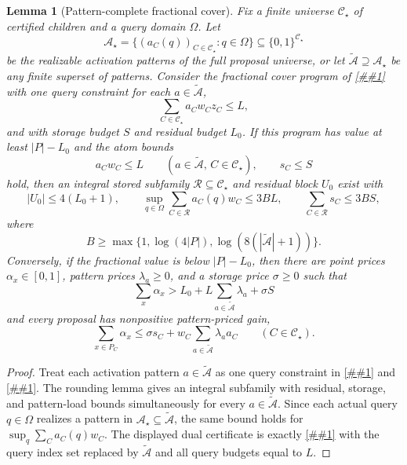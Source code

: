 \documentclass[10pt]{article}
\newcommand{\cref}[1]{\ref{##1}}
\newtheorem{lemma}[theorem]{Lemma}
\theoremstyle{definition}
\begin{document}
\begin{lemma}[Pattern-complete fractional cover]\label{lem:pattern-complete-cover}
   Fix a finite universe $\mathcal C_\star$ of certified children and a query
   domain $\Omega$.  Let
   \[
      \mathcal A_\star
      =
      \{(a_C(q))_{C\in\mathcal C_\star}:q\in\Omega\}
      \subseteq\{0,1\}^{\mathcal C_\star}
   \]
   be the realizable activation patterns of the full proposal universe, or let
   $\widetilde{\mathcal A}\supseteq\mathcal A_\star$ be any finite superset of
   patterns.  Consider the fractional cover program of
   \cref{lem:finite-pool-dual} with one query constraint for each
   $a\in\widetilde{\mathcal A}$,
   \[
      \sum_{C\in\mathcal C_\star} a_C w_C z_C\le L,
   \]
   and with storage budget $S$ and residual budget $L_0$.  If this program has
   value at least $|P|-L_0$ and the atom bounds
   \[
      a_Cw_C\le L\qquad(a\in\widetilde{\mathcal A},\,C\in\mathcal C_\star),
      \qquad
      s_C\le S
   \]
   hold, then an integral stored subfamily $\mathcal R\subseteq\mathcal C_\star$
   and residual block $U_0$ exist with
   \[
      |U_0|\le4(L_0+1),
      \qquad
      \sup_{q\in\Omega}\sum_{C\in\mathcal R}a_C(q)w_C\le3BL,
      \qquad
      \sum_{C\in\mathcal R}s_C\le3BS,
   \]
   where
   \[
      B\ge
      \max\{1,\log(4|P|),\log(8(|\widetilde{\mathcal A}|+1))\}.
   \]
   Conversely, if the fractional value is below $|P|-L_0$, then there are point
   prices $\alpha_x\in[0,1]$, pattern prices $\lambda_a\ge0$, and a storage
   price $\sigma\ge0$ such that
   \[
      \sum_x\alpha_x
      >
      L_0+L\sum_{a\in\widetilde{\mathcal A}}\lambda_a+\sigma S
   \]
   and every proposal has nonpositive pattern-priced gain,
   \[
      \sum_{x\in P_C}\alpha_x
      \le
      \sigma s_C
      +
      w_C\sum_{a\in\widetilde{\mathcal A}}\lambda_a a_C
      \qquad(C\in\mathcal C_\star).
   \]
\end{lemma}

\begin{proof}
   Treat each activation pattern $a\in\widetilde{\mathcal A}$ as one query
   constraint in \cref{lem:finite-pool-dual} and
   \cref{lem:fractional-cover-materialization}.  The rounding lemma gives an
   integral subfamily with residual, storage, and pattern-load bounds
   simultaneously for every $a\in\widetilde{\mathcal A}$.  Since each actual
   query $q\in\Omega$ realizes a pattern in
   $\mathcal A_\star\subseteq\widetilde{\mathcal A}$, the same bound holds for
   $\sup_q\sum_Ca_C(q)w_C$.  The displayed dual certificate is exactly
   \cref{lem:finite-pool-dual} with the query index set replaced by
   $\widetilde{\mathcal A}$ and all query budgets equal to $L$.
\end{proof}
\end{document}
